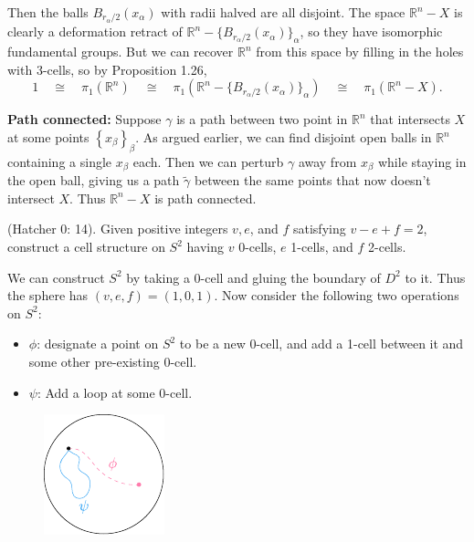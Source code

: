 \documentclass[twoside,10pt]{article}
\begin{document}
\begin{enumerate}
		Then the balls $B_{r_{\alpha}/2}(x_{\alpha})$ with radii halved are all disjoint. The space $\mathbb{R}^{n}-X$ is clearly a deformation retract of $\mathbb{R}^{n} - \{B_{r_{\alpha}/2}(x_{\alpha})\}_{\alpha}$, so they have isomorphic fundamental groups. But we can recover $\mathbb{R}^{n}$ from this space by filling in the holes with 3-cells, so by Proposition 1.26,
		\[
			1 \quad\cong\quad \pi_1(\mathbb{R}^{n}) \quad\cong\quad \pi_1\left( \mathbb{R}^{n} - \{B_{r_{\alpha}/2}(x_{\alpha})\}_{\alpha} \right) \quad\cong\quad \pi_1(\mathbb{R}^{n}-X).
		\] 

		\textbf{Path connected:} Suppose $\gamma$ is a path between two point in $\mathbb{R}^{n}$ that intersects $X$ at some points $\left\{ x_{\beta} \right\}_{\beta}$. As argued earlier, we can find disjoint open balls in $\mathbb{R}^{n}$ containing a single $x_{\beta}$ each. Then we can perturb $\gamma$ away from $x_{\beta}$ while staying in the open ball, giving us a path $\tilde{\gamma}$ between the same points that now doesn't intersect $X$. Thus $\mathbb{R}^{n}-X$ is path connected.
\end{enumerate}

\newpage

\begin{exer}
	(Hatcher 0: 14). Given positive integers $v,e$, and $f$ satisfying $v-e+f=2$, construct a cell structure on $S^2$ having $v$ 0-cells, $e$ 1-cells, and $f$ 2-cells.
\end{exer}

We can construct $S^2$ by taking a 0-cell and gluing the boundary of $D^2$ to it. Thus the sphere has $(v,e,f) = (1,0,1)$. Now consider the following two operations on $S^2$:
\begin{itemize}
	\item $\phi$: designate a point on $S^2$ to be a new 0-cell, and add a 1-cell between it and some other pre-existing 0-cell.
	\item $\psi$: Add a loop at some 0-cell.
\end{itemize}
\begin{figure}[H]
	\centering
	\includegraphics[scale=2]{fig/14.pdf}
\end{figure}
\end{document}
